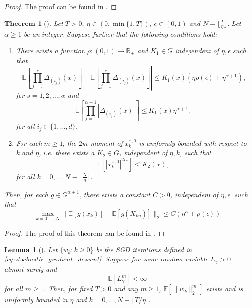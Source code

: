 \documentclass[12pt]{article}
\newtheorem{theorem}{Theorem}[section]
\newtheorem{lemma}[lemma]{Lemma}
\theoremstyle{definition}
\numberwithin{equation}{section}
\newcommand{\R}{\mathbb{R}}
\newcommand{\ev}[1]{\mathbb{E}\left[{#1}\right]}
\newcommand{\norm}[1]{\lVert{#1}\rVert_2}
\begin{document}
\begin{proof}
  The proof can be found in \cite{liStochasticModifiedEquations2019}.
\end{proof}
\begin{theorem}[]
  \label{thm:approximation}
  Let $T > 0, \; \eta \in (0,\min\{1,T\}), \: \epsilon \in (0,1)$ and $N = \lfloor \frac{T}{\eta} \rfloor$. Let $\alpha \geq 1$ be an integer. Suppose further that the following conditions hold:
  \begin{enumerate}[label=(\roman*)]
    \item There exists a function $\rho : (0,1) \rightarrow \R_+$ and $K_1 \in G$ independent of $\eta, \epsilon$ such that
    \begin{equation*}
      \left\lvert \ev{\prod_{j=1}^s \Delta_{(i_j)}(x)} - \ev{\prod_{j=1}^s \tilde{\Delta}_{(i_j)}(x)}\right\rvert \leq K_1(x)(\eta \rho(\epsilon) + \eta^{\alpha+1}),
    \end{equation*}
    for $s=1,2,\dots,\alpha$ and
    \begin{equation*}
      \ev{\prod_{j=1}^{\alpha+1}\left\lvert \Delta_{(i_j)}(x)\right\rvert} \leq K_1(x)\eta^{\alpha+1},
    \end{equation*}
    for all $i_j \in \{1,\dots,d\}$.
    \item For each $m \geq 1$, the $2m$-moment of $x_k^{x,0}$ is uniformly bounded with respect to $k$ and $\eta$, i.e. there exists a $K_2 \in G$, independent of $\eta, k$, such that
    \begin{equation*}
      \ev{\left\lvert x_k^{x,0} \right\rvert^{2m}} \leq K_2(x),
    \end{equation*}
    for all $k = 0, \dots, N \equiv \lfloor \frac{N}{\eta} \rfloor$.
  \end{enumerate}
  Then, for each $g \in G^{\alpha + 1}$, there exists a constant $C > 0$, independent of $\eta, \epsilon$, such that
  \begin{equation*}
    \max_{k=0,\dots,N}\norm{\ev{g(x_k)} - \ev{g(X_{k\eta})}} \leq C(\eta^{\alpha} + \rho(\epsilon))
  \end{equation*}
\end{theorem}
\begin{proof}
  The proof of this theorem can be found in \cite{liStochasticModifiedEquations2019}.
\end{proof}
\begin{lemma}[]
  \label{lemma:moment_bound}
  Let $\{w_k: k \geq 0 \}$ be the SGD iterations defined in \eqref{eq:stochastic_gradient_descent}. Suppose for some random variable $L_{\gamma} > 0$ almost surely and 
  \begin{equation*}
    \ev{L_{\gamma}^m} < \infty
  \end{equation*}
  for all $m \geq 1$. Then, for fixed $T > 0$ and any $m \geq 1$, $\ev{\norm{w_k}^m}$ exists and is uniformly bounded in $\eta$ and $k=0,\dots,N\equiv \lfloor T / \eta \rfloor$.
\end{lemma}
\end{document}

